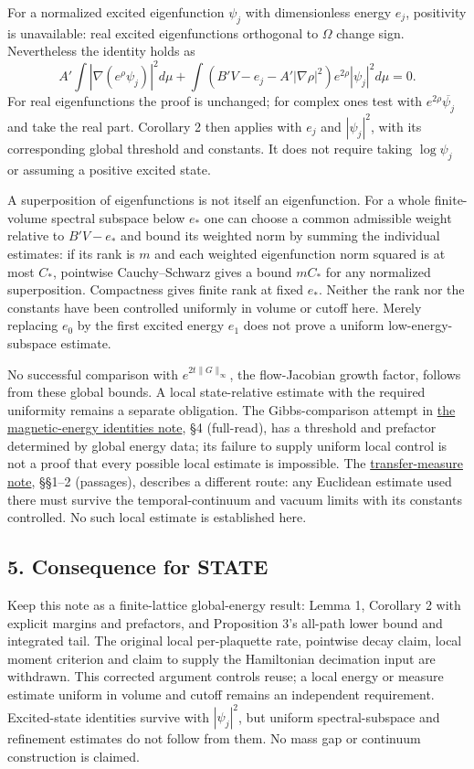\documentclass[11pt,a4paper]{article}
\begin{document}
For a normalized excited eigenfunction \(\psi_j\) with dimensionless
energy \(e_j\), positivity is unavailable: real excited eigenfunctions
orthogonal to \(\Omega\) change sign. Nevertheless the identity holds as
\[A'\int|\nabla(e^\rho\psi_j)|^2d\mu
+\int(B'V-e_j-A'|\nabla\rho|^2)e^{2\rho}|\psi_j|^2d\mu=0.\] For real
eigenfunctions the proof is unchanged; for complex ones test with
\(e^{2\rho}\overline{\psi_j}\) and take the real part. Corollary 2 then
applies with \(e_j\) and \(|\psi_j|^2\), with its corresponding global
threshold and constants. It does not require taking \(\log\psi_j\) or
assuming a positive excited state.

A superposition of eigenfunctions is not itself an eigenfunction. For a
whole finite-volume spectral subspace below \(e_*\) one can choose a
common admissible weight relative to \(B'V-e_*\) and bound its weighted
norm by summing the individual estimates: if its rank is \(m\) and each
weighted eigenfunction norm squared is at most \(C_*\), pointwise
Cauchy--Schwarz gives a bound \(mC_*\) for any normalized superposition.
Compactness gives finite rank at fixed \(e_*\). Neither the rank nor the
constants have been controlled uniformly in volume or cutoff here.
Merely replacing \(e_0\) by the first excited energy \(e_1\) does not
prove a uniform low-energy-subspace estimate.

No successful comparison with \(e^{2t\|G\|_\infty}\), the flow-Jacobian
growth factor, follows from these global bounds. A local state-relative
estimate with the required uniformity remains a separate obligation. The
Gibbs-comparison attempt in \href{magnetic-energy-identities.md}{the
magnetic-energy identities note}, §4 (full-read), has a threshold and
prefactor determined by global energy data; its failure to supply
uniform local control is not a proof that every possible local estimate
is impossible. The
\href{ground-state-measure-transfer.md}{transfer-measure note}, §§1--2
(passages), describes a different route: any Euclidean estimate used
there must survive the temporal-continuum and vacuum limits with its
constants controlled. No such local estimate is established here.

\hypertarget{consequence-for-state}{%
\subsection{5. Consequence for STATE}\label{consequence-for-state}}

Keep this note as a finite-lattice global-energy result: Lemma 1,
Corollary 2 with explicit margins and prefactors, and Proposition 3's
all-path lower bound and integrated tail. The original local
per-plaquette rate, pointwise decay claim, local moment criterion and
claim to supply the Hamiltonian decimation input are withdrawn. This
corrected argument controls reuse; a local energy or measure estimate
uniform in volume and cutoff remains an independent requirement.
Excited-state identities survive with \(|\psi_j|^2\), but uniform
spectral-subspace and refinement estimates do not follow from them. No
mass gap or continuum construction is claimed.
\end{document}
